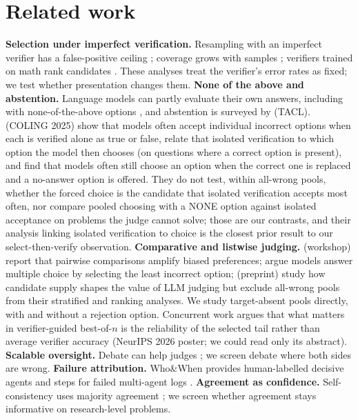 \documentclass[10pt,twocolumn]{article}
\begin{document}
\section{Related work}
\textbf{Selection under imperfect verification.} Resampling with an imperfect verifier has a false-positive ceiling \citep{stroebl2026limits}; coverage grows with samples \citep{brown2024large}; verifiers trained on math rank candidates \citep{cobbe2021training,lightman2024lets}. These analyses treat the verifier's error rates as fixed; we test whether presentation changes them.
\textbf{None of the above and abstention.} Language models can partly evaluate their own answers, including with none-of-the-above options \citep{kadavath2022language}, and abstention is surveyed by \citet{wen2024know} (TACL). \citet{wang2025llms} (COLING 2025) show that models often accept individual incorrect options when each is verified alone as true or false, relate that isolated verification to which option the model then chooses (on questions where a correct option is present), and find that models often still choose an option when the correct one is replaced and a no-answer option is offered. They do not test, within all-wrong pools, whether the forced choice is the candidate that isolated verification accepts most often, nor compare pooled choosing with a NONE option against isolated acceptance on problems the judge cannot solve; those are our contrasts, and their analysis linking isolated verification to choice is the closest prior result to our select-then-verify observation. \textbf{Comparative and listwise judging.} \citet{jeong2025comparative} (workshop) report that pairwise comparisons amplify biased preferences; \citet{wang2025llms} argue models answer multiple choice by selecting the least incorrect option; \citet{ji2026candidate} (preprint) study how candidate supply shapes the value of LLM judging but exclude all-wrong pools from their stratified and ranking analyses. We study target-absent pools directly, with and without a rejection option.
Concurrent work argues that what matters in verifier-guided best-of-$n$ is the reliability of the selected tail rather than average verifier accuracy \citep{zhang2026selected} (NeurIPS 2026 poster; we could read only its abstract). \textbf{Scalable oversight.} Debate can help judges \citep{irving2018ai,khan2024debating,kenton2024scalable}; we screen debate where both sides are wrong. \textbf{Failure attribution.} Who\&When provides human-labelled decisive agents and steps for failed multi-agent logs \citep{zhang2025which}. \textbf{Agreement as confidence.} Self-consistency uses majority agreement \citep{wang2023self}; we screen whether agreement stays informative on research-level problems.
\end{document}
